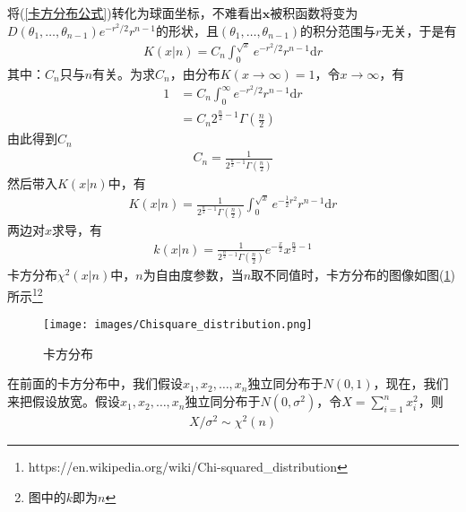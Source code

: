         将(\ref{卡方分布公式})转化为球面坐标，不难看出$\mathbf{x}$被积函数将变为$D(\theta_1,\dots,\theta_{n-1})e^{-r^2/2}r^{n-1}$的形状，且$(\theta_1,\dots,\theta_{n-1})$的积分范围与$r$无关，于是有
        \begin{align*}
        K(x|n) = C_n \int_0^{\sqrt{x}}e^{-r^2/2}r^{n-1}\mathrm{d}r
        \end{align*}
        其中：$C_n$只与$n$有关。为求$C_n$，由分布$K(x\rightarrow \infty) =1$，令$x\rightarrow \infty$，有
        \begin{align*}
        1 &= C_n\int_0^\infty e^{-r^2/2}r^{n-1}\mathrm{d}r \\
        &= C_n2^{\frac{n}{2}-1}\Gamma \left( \frac{n}{2} \right)
        \end{align*}
        由此得到$C_n$
        \begin{align*}
        C_n = \frac{1}{2^{\frac{n}{2}-1}\Gamma \left( \frac{n}{2} \right)}
        \end{align*}
        然后带入$K(x|n)$中，有
        \begin{align*}
        K(x|n) = \frac{1}{2^{\frac{n}{2}-1}\Gamma \left( \frac{n}{2} \right)} \int_0^{\sqrt{x}}e^{-\frac 12 r^2}r^{n-1}\mathrm{d}r
        \end{align*}
        两边对$x$求导，有
        \begin{align*}
        k(x|n) = \frac{1}{2^{\frac{n}{2}-1}\Gamma \left( \frac{n}{2} \right)}e^{-\frac{x}{2}}x^{\frac{n}{2}-1}
        \end{align*}
        卡方分布$\chi^2(x|n)$中，$n$为自由度参数，当$n$取不同值时，卡方分布的图像如图(\ref{fig:卡方分布图})所示\footnote{https://en.wikipedia.org/wiki/Chi-squared\_distribution}\footnote{图中的$k$即为$n$}
           \begin{figure}[H]
           \centering
           \texttt{[image: images/Chisquare\_distribution.png]}
           \caption{卡方分布}
           \label{fig:卡方分布图}
           \end{figure}
        \begin{corollary}[卡方分布的一般形式1]
        在前面的卡方分布中，我们假设$x_1,x_2,\dots,x_n$独立同分布于$N(0,1)$，现在，我们来把假设放宽。假设$x_1,x_2,\dots,x_n$独立同分布于$N(0,\sigma^2)$，令$X = \sum_{i= 1}^nx_i^2$，则
        \begin{align*}
        X/\sigma^2 \sim \chi^2(n)
        \end{align*}
        \end{corollary}
